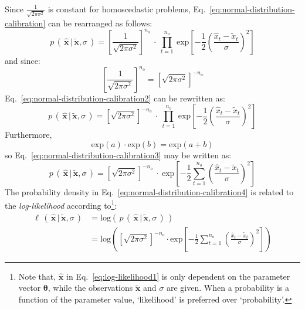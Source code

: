 \vspace{1em}
Since $\frac{1}{\sqrt{2\pi\sigma^2}}$ is constant for homoscedastic problems, Eq.~\ref{eq:normal-distribution-calibration} can be rearranged as follows:
\begin{equation}\label{eq:normal-distribution-calibration2}
p\,(\,\hat{\mathbf{x}}\,|\,\tilde{\mathbf{x}},\sigma\,) = \left[\frac{1}{\sqrt{2\pi\sigma^2}}\right]^{n_o}\:\cdot{}\:\prod_{t=1}^{n_o}\:\mathrm{exp}\left[{-\frac{1}{2}\left(\frac{\hat{x}_t-\tilde{x}_t}{\sigma}\right)^2}\right]
\end{equation}
and since:
\begin{equation}
\left[\frac{1}{\sqrt{2\pi\sigma^2}}\right]^{n_o} = \left[\sqrt{2\pi\sigma^2}\right]^{-n_o} \nonumber
\end{equation}
Eq.~\ref{eq:normal-distribution-calibration2} can be rewritten as:
\begin{equation}\label{eq:normal-distribution-calibration3}
p\,(\,\hat{\mathbf{x}}\,|\,\tilde{\mathbf{x}},\sigma\,) = \left[\sqrt{2\pi\sigma^2}\right]^{-n_o}\:\cdot{}\:\prod_{t=1}^{n_o}\:\mathrm{exp}\left[{-\frac{1}{2}\left(\frac{\hat{x}_t-\tilde{x}_t}{\sigma}\right)^2}\right]
\end{equation}
Furthermore,
\begin{equation}
\mathrm{exp}(a)\cdot{}\mathrm{exp}(b)=\mathrm{exp}(a+b)
\end{equation}
so Eq.~\ref{eq:normal-distribution-calibration3} may be written as:
\begin{equation}\label{eq:normal-distribution-calibration4}
p\,(\,\hat{\mathbf{x}}\,|\,\tilde{\mathbf{x}},\sigma\,) = \left[\sqrt{2\pi\sigma^2}\right]^{-n_o}\:\cdot{}\:\mathrm{exp}\left[-\frac{1}{2}\sum_{t=1}^{n_o}\left(\frac{\hat{x}_t-\tilde{x}_t}{\sigma}\right)^2\right]
\end{equation}
The probability density in Eq.~\ref{eq:normal-distribution-calibration4} is related to the \textit{log-likelihood} according to\footnote{Note that, $\hat{\mathbf{x}}$ in Eq.~\ref{eq:log-likelihood1} is only dependent on the parameter vector  $\boldsymbol\theta$, while the observations $\tilde{\mathbf{x}}$ and $\sigma$ are given. When a probability is a function of the parameter value, `likelihood' is preferred over `probability'.}:
\begin{align}\label{eq:log-likelihood1}
\ell\,(\,\hat{\mathbf{x}}\,|\,\tilde{\mathbf{x}},\sigma\,) &= \mathrm{log}\left(\,p\,(\,\hat{\mathbf{x}}\,|\,\tilde{\mathbf{x}},\sigma\,)\,\right)\\
&=\mathrm{log}\left(\left[\sqrt{2\pi\sigma^2}\right]^{-n_o}\cdot{}\mathrm{exp}\left[-\frac{1}{2}\sum_{t=1}^{n_o}\left(\frac{\hat{x}_t-\tilde{x}_t}{\sigma}\right)^2\right]
\right)
\end{align}
